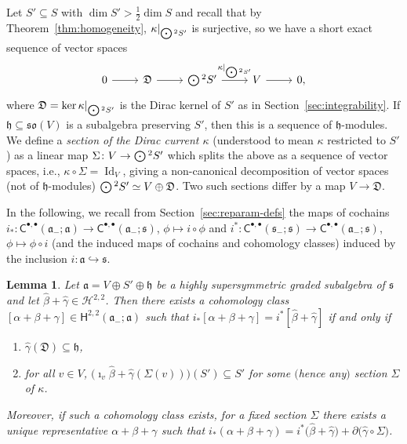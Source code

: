 \documentclass[pdftex]{sigma}
\numberwithin{equation}{section}
\newtheorem{Lemma}[Theorem]{Lemma}
\newcommand{\fa}{\mathfrak{a}}
\newcommand{\fh}{\mathfrak{h}}
\newcommand{\fs}{\mathfrak{s}}
\newcommand{\fso}{\mathfrak{so}}
\newcommand{\fD}{\mathfrak{D}}
\newcommand{\cH}{\mathcal{H}}
\newcommand{\ssC}{\mathsf{C}}
\newcommand{\ssH}{\mathsf{H}}
\newcommand{\betahat}{\widehat{\beta}}
\newcommand{\gammahat}{\widehat{\gamma}}
\newcommand{\Odot}{\mathchoice{{\textstyle\bigodot}}{\bigodot}{\bigodot}{\bigodot}}
\newcommand{\1}{\mathbbm{1}}
\DeclareMathOperator{\Id}{Id}
\begin{document}
Let $S'\subseteq S$ with $\dim S'>\frac{1}{2}\dim S$ and recall that by Theorem~\ref{thm:homogeneity}, $\kappa|_{\Odot^2S'}$ is surjective, so we have a short exact sequence of vector spaces
\[%
\begin{tikzcd}
	0 \ar[r] & \fD \ar[r] & \Odot^2S' \ar[r,"\kappa|_{\Odot^2S'}"] & V \ar[r] & 0,
\end{tikzcd}
\]
where $\fD=\ker\kappa|_{\Odot^2S'}$ is the Dirac kernel of $S'$ as in Section~\ref{sec:integrability}. If $\fh\subseteq\fso(V)$ is a subalgebra preserving $S'$, then this is a sequence of $\fh$-modules. We define a \emph{section of the Dirac current $\kappa$} (understood to mean $\kappa$ restricted to $S'$) as a linear map $\Sigma\colon V\to\Odot^2S'$ which splits the above as a sequence of vector spaces, i.e., $\kappa\circ\Sigma=\Id_V$, giving a non-canonical decomposition of vector spaces (not of $\fh$-modules) $\Odot^2S'\simeq V\oplus\fD$. Two such sections differ by a map $V\to \fD$.

In the following, we recall from Section~\ref{sec:reparam-defs} the maps of cochains $i_*\colon\ssC^{\bullet,\bullet}(\fa_-;\fa) \to \!\ssC^{\bullet,\bullet}(\fa_-;\fs)$, $\phi\mapsto i\circ\phi$ and $i^*\colon\ssC^{\bullet,\bullet}(\fs_-;\fs) \to \ssC^{\bullet,\bullet}(\fa_-;\fs)$, $\phi\mapsto \phi\circ i$ (and the induced maps of cochains and cohomology classes) induced by the inclusion $i\colon\fa\hookrightarrow\fs$.

\begin{Lemma}\label{lemma:admissible-cocycles-sections}
	Let $\fa=V\oplus S'\oplus\fh$ be a highly supersymmetric graded subalgebra of $\fs$ and let $\betahat+\gammahat\in\cH^{2,2}$. Then there exists a cohomology class $[\alpha+\beta+\gamma]\in\ssH^{2,2}(\fa_-;\fa)$ such that $i_*[\alpha+\beta+\gamma]=i^*[\betahat+\gammahat]$ if and only if
	\begin{enumerate}\itemsep=0pt
	\item[$(1)$] $\gammahat(\fD)\subseteq\fh$,
	\item[$(2)$] for all $v\in V$, $\bigl(\imath_v\betahat+\gammahat(\Sigma(v))\bigr)(S')\subseteq S'$ for some $($hence any$)$ section $\Sigma$ of $\kappa$.
	\end{enumerate}	
	Moreover, if such a cohomology class exists, for a fixed section $\Sigma$ there exists a unique representative $\alpha+\beta+\gamma$ such that $i_*(\alpha+\beta+\gamma)=i^*\bigl(\betahat+\gammahat\bigr)+\partial\bigl(\gammahat\circ\Sigma\bigr)$.
\end{Lemma}
\end{document}

